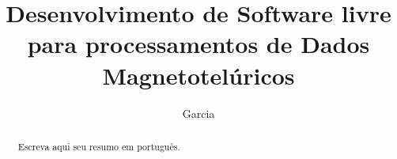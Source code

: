 \documentclass[csgeo,tcc]{unipampa}
\title{Desenvolvimento de Software livre para processamentos de Dados Magnetotelúricos}
\author{Garcia}{Patrick Rogger}
\begin{document}
\maketitle















	
















	\begin{abstract} 
		Escreva aqui seu resumo em português. 		
	\end{abstract}
\end{document}
